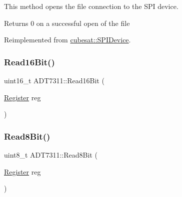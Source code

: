 This method opens the file connection to the S\+PI device. \begin{DoxyReturn}{Returns}
0 on a successful open of the file 
\end{DoxyReturn}


Reimplemented from \hyperlink{classcubesat_1_1SPIDevice_a2467a2271529579bdeaf0ffb6078b253}{cubesat\+::\+S\+P\+I\+Device}.

\mbox{\label{classcubesat_1_1ADT7311_a9147cb2c01b121fe0576eb36c9fcc18f}} 
\subsubsection{\texorpdfstring{Read16\+Bit()}{Read16Bit()}}
{\footnotesize\ttfamily uint16\+\_\+t A\+D\+T7311\+::\+Read16\+Bit (\begin{DoxyParamCaption}\item[{\hyperlink{classcubesat_1_1ADT7311_a0c841a239b3da653d4304377b3e83b45}{Register}}]{reg }\end{DoxyParamCaption})\hspace{0.3cm}{\ttfamily [private]}}

\mbox{\label{classcubesat_1_1ADT7311_a0f0c46f2a75ebb5661e27c3340b089a4}} 
\subsubsection{\texorpdfstring{Read8\+Bit()}{Read8Bit()}}
{\footnotesize\ttfamily uint8\+\_\+t A\+D\+T7311\+::\+Read8\+Bit (\begin{DoxyParamCaption}\item[{\hyperlink{classcubesat_1_1ADT7311_a0c841a239b3da653d4304377b3e83b45}{Register}}]{reg }\end{DoxyParamCaption})\hspace{0.3cm}{\ttfamily [private]}}

\mbox{\label{classcubesat_1_1ADT7311_a30816e820813a843a945583572676c13}} 
